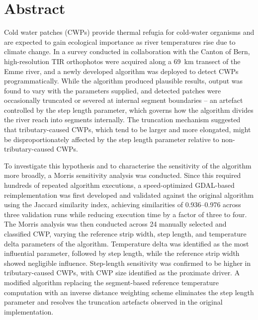 \documentclass[english,11pt,a4paper,oneside]{report}
\begin{document}
	
	\newpage
	
	\pagestyle{empty}
	
	\section*{Abstract}
	
	Cold water patches (CWPs) provide thermal refugia for cold-water organisms 
	and are expected to gain ecological importance as river temperatures rise due to 
	climate change. In a survey conducted in collaboration with the Canton of Bern, 
	high-resolution TIR orthophotos were acquired along a 69~km transect of the 
	Emme river, and a newly developed algorithm was deployed to detect CWPs 
	programmatically. While the algorithm produced plausible results, output was 
	found to vary with the parameters supplied, and detected patches were 
	occasionally truncated or severed at internal segment boundaries -- an artefact 
	controlled by the step length parameter, which governs how the algorithm divides 
	the river reach into segments internally. The truncation mechanism suggested 
	that tributary-caused CWPs, which tend to be larger and more elongated, might 
	be disproportionately affected by the step length parameter relative to 
	non-tributary-caused CWPs.
	
	To investigate this hypothesis and to characterise the sensitivity of the 
	algorithm more broadly, a Morris sensitivity analysis was conducted. Since this 
	required hundreds of repeated algorithm executions, a speed-optimized 
	GDAL-based reimplementation was first developed and validated against the 
	original algorithm using the Jaccard similarity index, achieving similarities 
	of 0.936--0.976 across three validation runs while reducing execution time by 
	a factor of three to four. The Morris analysis was then conducted across 24 
	manually selected and classified CWP, varying the reference strip width, 
	step length, and temperature delta parameters of the algorithm. Temperature 
	delta was identified as the most influential parameter, followed by step 
	length, while the reference strip width showed negligible influence. 
	Step-length sensitivity was confirmed to be higher in tributary-caused CWPs, 
	with CWP size identified as the proximate driver. A modified algorithm 
	replacing the segment-based reference temperature computation with an inverse 
	distance weighting scheme eliminates the step length parameter and resolves 
	the truncation artefacts observed in the original implementation.
	
\end{document}
